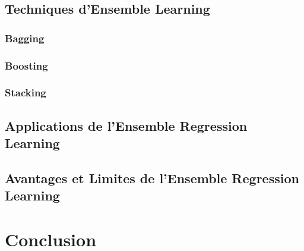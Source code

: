 \subsection{Techniques d'Ensemble Learning}
\subsubsection{Bagging}
\subsubsection{Boosting}
\subsubsection{Stacking}
\subsection{Applications de l'Ensemble Regression Learning}
\subsection{Avantages et Limites de l'Ensemble Regression Learning}

\section{Conclusion}
